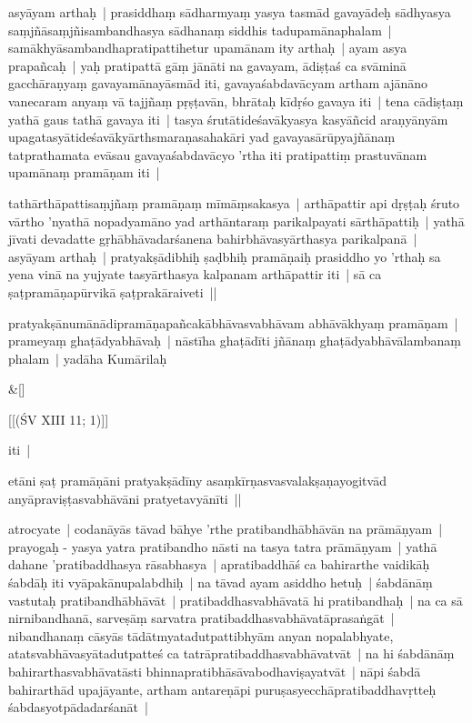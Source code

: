\documentclass[article,a4paper]{memoir}
\begin{document}
	

	  \pstart asyā\-yam arthaḥ | prasiddhaṃ sā\-dharmyaṃ yasya tasmā\-d gavayā\-deḥ sā\-dhyasya saṃjñā\-saṃjñisambandhasya sā\-dhanaṃ siddhis tadupamā\-naphalam | samā\-khyā\-sambandhapratipattihetur upamā\-nam ity arthaḥ | ayam asya prapañcaḥ | yaḥ pratipattā\- gā\-ṃ jā\-nā\-ti na gavayam, ā\-diṣṭaś ca svā\-minā\- gacchā\-raṇyaṃ gavayamā\-nayā\-smā\-d iti, gavayaśabdavā\-cyam artham ajā\-nā\-no vanecaram anyaṃ vā\- tajjñaṃ pṛṣṭavā\-n, bhrā\-taḥ kī\-dṛśo gavaya iti | tena cā\-diṣṭaṃ yathā\- gaus tathā\- gavaya iti | tasya śrutā\-tideśavā\-kyasya kasyā\-ñcid araṇyā\-nyā\-m upagatasyā\-tideśavā\-kyā\-rthsmaraṇasahakā\-ri yad gavayasā\-rū\-pyajñā\-naṃ tatprathamata evā\-sau gavayaśabdavā\-cyo 'rtha iti pratipattiṃ prastuvā\-nam upamā\-naṃ pramā\-ṇam iti |
	\pend
      

	  \pstart tathā\-rthā\-pattisaṃjñaṃ pramā\-ṇaṃ mī\-mā\-ṃsakasya | arthā\-pattir api dṛṣṭaḥ śruto vā\-rtho 'nyathā\- nopadyamā\-no yad arthā\-ntaraṃ parikalpayati sā\-rthā\-pattiḥ | yathā\- jī\-vati devadatte gṛhā\-bhā\-vadarśanena bahirbhā\-vasyā\-rthasya parikalpanā\- | asyā\-yam arthaḥ | pratyakṣā\-dibhiḥ ṣaḍbhiḥ pramā\-ṇaiḥ prasiddho yo 'rthaḥ sa yena vinā\- na yujyate tasyā\-rthasya kalpanam arthā\-pattir iti | sā\- ca ṣaṭpramā\-ṇapū\-rvikā\- ṣaṭprakā\-raiveti ||
	\pend
      

	  \pstart pratyakṣā\-numā\-nā\-dipramā\-ṇapañcakā\-bhā\-vasvabhā\-vam abhā\-vā\-khyaṃ pramā\-ṇam | prameyaṃ ghaṭā\-dyabhā\-vaḥ | nā\-stī\-ha ghaṭā\-dī\-ti jñā\-naṃ ghaṭā\-dyabhā\-vā\-lambanaṃ phalam | yadā\-ha Kumā\-rilaḥ
	\pend
      
	    
	    \stanza[\smallbreak]
\&[\smallbreak]


	[[(ŚV XIII 11; 1)]]

	  \pstart iti | 
	\pend
      

	  \pstart etā\-ni ṣaṭ pramā\-ṇā\-ni pratyakṣā\-dī\-ny asaṃkī\-rṇasvasvalakṣaṇayogitvā\-d anyā\-praviṣṭasvabhā\-vā\-ni pratyetavyā\-nī\-ti ||
	\pend
      

	  \pstart atrocyate | codanā\-yā\-s tā\-vad bā\-hye 'rthe pratibandhā\-bhā\-vā\-n na prā\-mā\-ṇyam | prayogaḥ - yasya yatra pratibandho nā\-sti na tasya tatra prā\-mā\-ṇyam | yathā\- dahane 'pratibaddhasya rā\-sabhasya | apratibaddhā\-ś ca bahirarthe vaidikā\-ḥ śabdā\-ḥ iti vyā\-pakā\-nupalabdhiḥ | na tā\-vad ayam asiddho hetuḥ | śabdā\-nā\-ṃ vastutaḥ pratibandhā\-bhā\-vā\-t | pratibaddhasvabhā\-vatā\- hi pratibandhaḥ | na ca sā\- nirnibandhanā\-, sarveṣā\-ṃ sarvatra pratibaddhasvabhā\-vatā\-prasaṅgā\-t | nibandhanaṃ cā\-syā\-s tā\-dā\-tmyatadutpattibhyā\-m anyan nopalabhyate, atatsvabhā\-vasyā\-tadutpatteś ca tatrā\-pratibaddhasvabhā\-vatvā\-t | na hi śabdā\-nā\-ṃ bahirarthasvabhā\-vatā\-sti bhinnapratibhā\-sā\-vabodhaviṣayatvā\-t | nā\-pi śabdā\- bahirarthā\-d upajā\-yante, artham antareṇā\-pi puruṣasyecchā\-pratibaddhavṛtteḥ śabdasyotpā\-dadarśanā\-t |
	\pend
      
\end{document}
